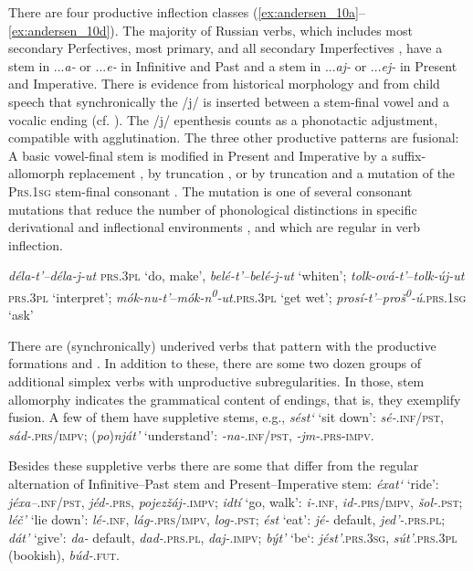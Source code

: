 \documentclass[output=paper, colorlinks,citecolor=brown]{langsci/langscibook}
\begin{document}
There are four productive inflection classes (\ref{ex:andersen_10a}--\ref{ex:andersen_10d}). The majority of Russian verbs, which includes most secondary Perfectives, most primary, and all secondary Imperfectives , have a stem in ...\textit{a-} or ...\textit{e-} in Infinitive and Past and a stem in ...\textit{aj-} or ...\textit{ej-} in Present and Imperative. There is evidence from historical morphology and from child speech that synchronically the /j/ is inserted between a stem-final vowel and a vocalic ending (cf. \citealt{Andersen1980}). The /j/ epenthesis counts as a phonotactic adjustment, compatible with agglutination. The three other productive patterns are fusional: A basic vowel-final stem is modified in Present and Imperative by a suffix-allomorph replacement , by truncation , or by truncation and a mutation of the \textsc{Prs.1sg} stem-final consonant . The mutation is one of several consonant mutations that reduce the number of phonological distinctions in specific derivational and inflectional environments \citep{Andersen1995}, and which are regular in verb inflection. 

\ea \label{ex:andersen_10} \ea
   \label{ex:andersen_10a} \textit{déla-t'–déla-j-ut} \textsc{prs.3pl} ‘do, make', \textit{belé-t'–belé-j-ut} ‘whiten';
 \ex \label{ex:andersen_10b} \textit{tolk-ová-t'}–\textit{tolk-új-ut} \textsc{prs.3pl} ‘interpret';
 \ex \label{ex:andersen_10c} \textit{mók-nu-t'}–\textit{mók-n\textsuperscript{0}}\textit{{}-ut.}\textsc{prs.3pl} ‘get wet'; 
 \ex \label{ex:andersen_10d} \textit{prosí-t'}–\textit{proš\textsuperscript{0}}\textit{{}-ú}.\textsc{prs.1sg} ‘ask'
 \z
 \z


There are (synchronically) underived verbs that pattern with the productive formations  and . In addition to these, there are some two dozen groups of additional simplex verbs with unproductive subregularities. In those, stem allomorphy indicates the grammatical content of endings, that is, they exemplify fusion. A few of them have suppletive stems, e.g., \textit{sést`} `sit down': \textit{s{\textquotesingle}é-}.\textsc{inf/pst}, \textit{s{\textquotesingle}ád-}.\textsc{prs/impv}; (\textit{po})\textit{nját'} `understand': \textit{-n{\textquotesingle}a-}.\textsc{inf/pst}, \textit{-jm-}.\textsc{prs-impv}. 

Besides these suppletive verbs there are some that differ from the regular alternation of Infinitive–Past stem and Present–Imperative stem: \textit{éxat`} `ride': \textit{jéxa–}.\textsc{inf/pst}, \textit{jéd-}.\textsc{prs}, \textit{pojezžáj-}.\textsc{impv}; \textit{idtí} `go, walk': \textit{i-}.\textsc{inf}, \textit{id-}.\textsc{prs/impv}, \textit{šol-}.\textsc{pst}; \textit{léč'} `lie down': \textit{l{\textquotesingle}é-}.\textsc{inf}, \textit{l{\textquotesingle}ág-}.\textsc{prs/impv}, \textit{l{\textquotesingle}og-}.\textsc{pst}; \textit{ést} `eat': \textit{jé-} default, \textit{jed'-}.\textsc{prs.pl}; \textit{dát'} `give': \textit{da-} default, \textit{dad-}.\textsc{prs.pl}, \textit{daj-}.\textsc{impv}; \textit{být'} `be`: \textit{jést'}.\textsc{prs.3sg}, \textit{sút'}.\textsc{prs.3pl} (bookish), \textit{búd-}.\textsc{fut}. 
\end{document}
